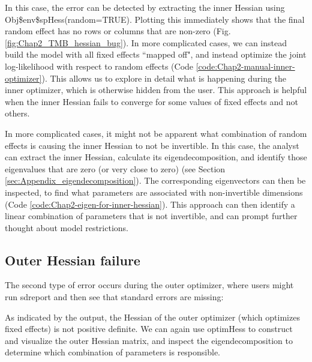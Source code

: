 In this case, the error can be detected by extracting the inner Hessian using \colorbox{backcolour}{Obj\$env\$spHess(random=TRUE)}.  Plotting this immediately shows that the final random effect has no rows or columns that are non-zero (Fig. \ref{fig:Chap2_TMB_hessian_bug}).  In more complicated cases, we can instead build the model with all fixed effects ``mapped off", and instead optimize the joint log-likelihood with respect to random effects (Code \ref{code:Chap2-manual-inner-optimizer}).  This allows us to explore in detail what is happening during the inner optimizer, which is otherwise hidden from the user. This approach is helpful when the inner Hessian fails to converge for some values of fixed effects and not others.  

\lstset{style=Rcode}


In more complicated cases, it might not be apparent what combination of random effects is causing the inner Hessian to not be invertible.  In this case, the analyst can extract the inner Hessian, calculate its eigendecomposition, and identify those eigenvalues that are zero (or very close to zero) (see Section \ref{sec:Appendix_eigendecomposition}).  The corresponding eigenvectors can then be inspected, to find what parameters are associated with non-invertible dimensions (Code \ref{code:Chap2-eigen-for-inner-hessian}).  This approach can then identify a linear combination of parameters that is not invertible, and can prompt further thought about model restrictions.  

\lstset{style=Rcode}


\subsection{Outer Hessian failure} \label{sec:Chap2_outer_hessian_failure}

The second type of error occurs during the outer optimizer, where users might run \colorbox{backcolour}{sdreport} and then see that standard errors are missing:

%
\lstset{style=Routput}

As indicated by the output, the Hessian of the outer optimizer (which optimizes fixed effects) is not positive definite.  We can again use \colorbox{backcolour}{optimHess} to construct and visualize the outer Hessian matrix, and inspect the eigendecomposition to determine which combination of parameters is responsible. 

